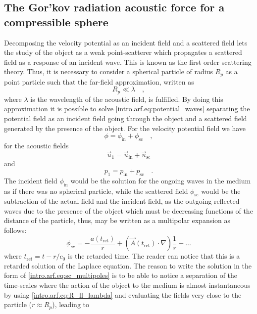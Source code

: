 \subsection{The Gor'kov radiation acoustic force for a compressible sphere}
Decomposing the velocity potential as an incident field and a scattered field lets the study of the object as a weak point-scatterer which propagates a scattered field as a response of an incident wave. This is known as the first order scattering theory. Thus, it is necessary to consider a spherical particle of radius $R_p$ as a point particle such that the far-field approximation, written as
\begin{equation}\label{intro.arf.eq:R_ll_lambda}
    R_p\ll\lambda\quad,
\end{equation}
where $\lambda$ is the wavelength of the acoustic field, is fulfilled. By doing this approximation it is possible to solve \eqref{intro.arf.eq:potential_waves} separating the potential field as an incident field going through the object and a scattered field generated by the presence of the object. For the velocity potential field we have
\begin{equation}\label{intro.arf.eq:in_sc_potential}
    \phi = \phi_{\text{in}} + \phi_{\text{sc}}\quad,    
\end{equation}
for the acoustic fields
\begin{equation}\label{intro.arf.eq:in_sc_velocity}
    \vec u_1 = \vec u_{\text{in}} + \vec u_{\text{sc}}
\end{equation}
and
\begin{equation}\label{intro.arf.eq:in_sc_pressure}
    p_1 = p_{\text{in}} + p_{\text{sc}}\quad.
\end{equation}
The incident field $\phi_{\text{in}}$ would be the solution for the ongoing waves in the medium as if there was no spherical particle, while the scattered field $\phi_{\text{sc}}$ would be the subtraction of the actual field and the incident field, as the outgoing reflected waves due to the presence of the object which must be decreasing functions of the distance of the particle, thus, may be written as a multipolar expansion as follows:
\begin{equation}\label{intro.arf.eq:sc_multipoles}
    \phi_{sc} = -\frac{a(t_{\text{ret}})}{r} + (\vec A(t_{\text{ret}}) \cdot \nabla)\frac{1}{r} + \dots
\end{equation}
where $t_{\text{ret}} = t - r/c_0$ is the retarded time. The reader can notice that this is a retarded solution of the Laplace equation. The reason to write the solution in the form of \eqref{intro.arf.eq:sc_multipoles} is to be able to notice a separation of the time-scales where the action of the object to the medium is almost instantaneous by using \eqref{intro.arf.eq:R_ll_lambda} and evaluating the fields very close to the particle ($r \approx R_p $), leading to
